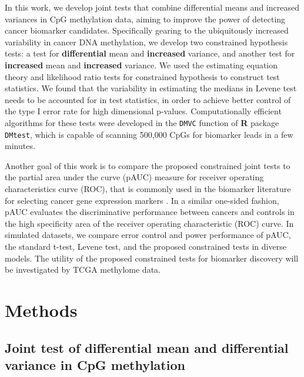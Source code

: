\documentclass{statsoc}
\begin{document}
In this work, we develop joint tests that combine differential means and increased variances in CpG methylation data, aiming to improve the power of detecting cancer biomarker candidates. Specifically gearing to the ubiquitously increased variability in cancer DNA methylation, we develop two constrained hypothesis tests: a test for {\bf differential} mean and {\bf increased} variance, and another test for {\bf increased} mean and {\bf increased} variance. We used the estimating equation theory and likelihood ratio tests for constrained hypothesis to construct test statistics. We found that the variability in estimating the medians in Levene test needs to be accounted for in test statistics, in order to achieve better control of the type I error rate for high dimensional p-values. Computationally efficient algorithms for these tests were developed in the \texttt{DMVC} function of {\bf R} package \texttt{DMtest}, which is capable of scanning 500,000 CpGs for biomarker leads in a few minutes.


Another goal of this work is to compare the proposed constrained joint tests to the partial area under the curve (pAUC) measure for receiver operating characteristics curve (ROC), that is commonly used in the biomarker literature for selecting cancer gene expression markers \citep{Pepe2003}. In a similar one-sided fashion, pAUC evaluates the discriminative performance between cancers and controls in the high specificity area of the receiver operating characteristic (ROC) curve. In simulated datasets, we compare error control and power performance of pAUC, the standard t-test, Levene test, and the proposed constrained tests in diverse models. The utility of the proposed constrained tests for biomarker discovery will be investigated by TCGA methylome data.


\section{Methods}
\label{sec2}

\subsection{Joint test of differential mean and differential variance in CpG methylation}
\end{document}
